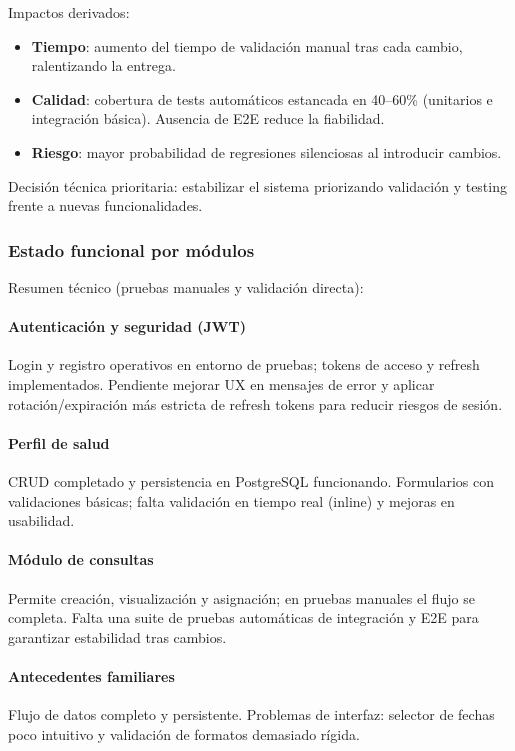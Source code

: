 \documentclass[a4paper,11pt]{article}
\begin{document}
Impactos derivados:
\begin{itemize}
	\item \textbf{Tiempo}: aumento del tiempo de validación manual tras cada cambio, ralentizando la entrega.
	\item \textbf{Calidad}: cobertura de tests automáticos estancada en 40--60\% (unitarios e integración básica). Ausencia de E2E reduce la fiabilidad.
	\item \textbf{Riesgo}: mayor probabilidad de regresiones silenciosas al introducir cambios.
\end{itemize}

Decisión técnica prioritaria: estabilizar el sistema priorizando validación y testing frente a nuevas funcionalidades.

\subsubsection*{Estado funcional por módulos}

Resumen técnico (pruebas manuales y validación directa):

\paragraph{Autenticación y seguridad (JWT)} Login y registro operativos en entorno de pruebas; tokens de acceso y refresh implementados. Pendiente mejorar UX en mensajes de error y aplicar rotación/expiración más estricta de refresh tokens para reducir riesgos de sesión.

\paragraph{Perfil de salud} CRUD completado y persistencia en PostgreSQL funcionando. Formularios con validaciones básicas; falta validación en tiempo real (inline) y mejoras en usabilidad.

\paragraph{Módulo de consultas} Permite creación, visualización y asignación; en pruebas manuales el flujo se completa. Falta una suite de pruebas automáticas de integración y E2E para garantizar estabilidad tras cambios.

\paragraph{Antecedentes familiares} Flujo de datos completo y persistente. Problemas de interfaz: selector de fechas poco intuitivo y validación de formatos demasiado rígida.
\end{document}
